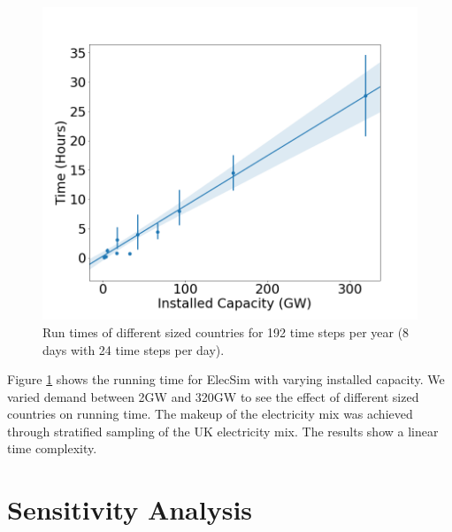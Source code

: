 \begin{figure}
	\centering
	\includegraphics[width=0.6\linewidth]{Chapter4/figures/timing_plot.png}
	\caption{Run times of different sized countries for 192 time steps per year (8 days with 24 time steps per day).}
	\label{fig:timingplot}
	\vskip -0.5cm
\end{figure}


Figure \ref{fig:timingplot} shows the running time for ElecSim with varying installed capacity. We varied demand between 2GW and 320GW to see the effect of different sized countries on running time. The makeup of the electricity mix was achieved through stratified sampling of the UK electricity mix. The results show a linear time complexity. 





\clearpage
\section{Sensitivity Analysis}
\label{elecsim:sec:sensitivity}

